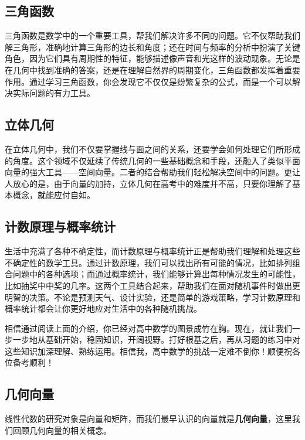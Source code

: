 \subsection{三角函数}

三角函数是数学中的一个重要工具，帮我们解决许多不同的问题。它不仅帮助我们解三角形，准确地计算三角形的边长和角度；还在时间与频率的分析中扮演了关键角色，因为它们具有周期性的特征，能够描述像声音和光这样的波动现象。无论是在几何中找到准确的答案，还是在理解自然界的周期变化，三角函数都发挥着重要作用。通过学习三角函数，你会发现它不仅仅是纷繁复杂的公式，而是一个可以解决实际问题的有力工具。

\subsection{立体几何}

在立体几何中，我们不仅要掌握线与面之间的关系，还要学会如何处理它们所形成的角度。这个领域不仅延续了传统几何的一些基础概念和手段，还融入了类似平面向量的强大工具——空间向量。二者的结合帮助我们轻松解决空间中的问题。更让人放心的是，由于向量的加持，立体几何在高考中的难度并不高，只要你理解了基本概念，就能应付自如。

\subsection{计数原理与概率统计}

生活中充满了各种不确定性，而计数原理与概率统计正是帮助我们理解和处理这些不确定性的数学工具。通过计数原理，我们可以找出所有可能的情况，比如排列组合问题中的各种选项；而通过概率统计，我们能够计算出每种情况发生的可能性，比如抽奖中中奖的几率。这两个工具结合起来，帮助我们在面对随机事件时做出更明智的决策。不论是预测天气、设计实验，还是简单的游戏策略，学习计数原理和概率统计都会让你更好地应对生活中的各种随机挑战。

相信通过阅读上面的介绍，你已经对高中数学的图景成竹在胸。现在，就让我们一步一步地从基础开始，稳固知识，开阔视野。打好根基之后，再从习题的练习中对这些知识加深理解、熟练运用。相信我，高中数学的挑战一定难不倒你！顺便祝各位备考顺利！


\subsection{几何向量}

线性代数的研究对象是向量和矩阵，而我们最早认识的向量就是\textbf{几何向量}，这里我们回顾几何向量的相关概念。

